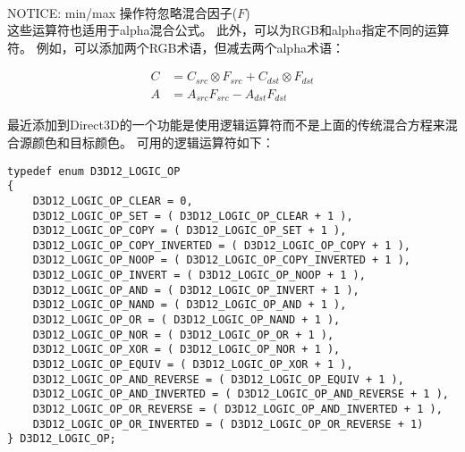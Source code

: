 \begin{flushleft}
~\\
NOTICE: min/max 操作符忽略混合因子($F$)
~\\

这些运算符也适用于alpha混合公式。 此外，可以为RGB和alpha指定不同的运算符。 例如，可以添加两个RGB术语，但减去两个alpha术语：\\
\end{flushleft}

\begin{align*}
C&=C_{src}\otimes F_{src}+C_{dst}\otimes F_{dst}\\
A&=A_{src}F_{src}-A_{dst}F_{dst}
\end{align*}

\begin{flushleft}
最近添加到Direct3D的一个功能是使用逻辑运算符而不是上面的传统混合方程来混合源颜色和目标颜色。 可用的逻辑运算符如下：\\
\end{flushleft}

\begin{lstlisting}
typedef enum D3D12_LOGIC_OP
{
    D3D12_LOGIC_OP_CLEAR = 0,
    D3D12_LOGIC_OP_SET = ( D3D12_LOGIC_OP_CLEAR + 1 ),
    D3D12_LOGIC_OP_COPY = ( D3D12_LOGIC_OP_SET + 1 ),
    D3D12_LOGIC_OP_COPY_INVERTED = ( D3D12_LOGIC_OP_COPY + 1 ),
    D3D12_LOGIC_OP_NOOP = ( D3D12_LOGIC_OP_COPY_INVERTED + 1 ),
    D3D12_LOGIC_OP_INVERT = ( D3D12_LOGIC_OP_NOOP + 1 ),
    D3D12_LOGIC_OP_AND = ( D3D12_LOGIC_OP_INVERT + 1 ),
    D3D12_LOGIC_OP_NAND = ( D3D12_LOGIC_OP_AND + 1 ),
    D3D12_LOGIC_OP_OR = ( D3D12_LOGIC_OP_NAND + 1 ),
    D3D12_LOGIC_OP_NOR = ( D3D12_LOGIC_OP_OR + 1 ),
    D3D12_LOGIC_OP_XOR = ( D3D12_LOGIC_OP_NOR + 1 ),
    D3D12_LOGIC_OP_EQUIV = ( D3D12_LOGIC_OP_XOR + 1 ),
    D3D12_LOGIC_OP_AND_REVERSE = ( D3D12_LOGIC_OP_EQUIV + 1 ),
    D3D12_LOGIC_OP_AND_INVERTED = ( D3D12_LOGIC_OP_AND_REVERSE + 1 ),
    D3D12_LOGIC_OP_OR_REVERSE = ( D3D12_LOGIC_OP_AND_INVERTED + 1 ),
    D3D12_LOGIC_OP_OR_INVERTED = ( D3D12_LOGIC_OP_OR_REVERSE + 1)
} D3D12_LOGIC_OP;
\end{lstlisting}

